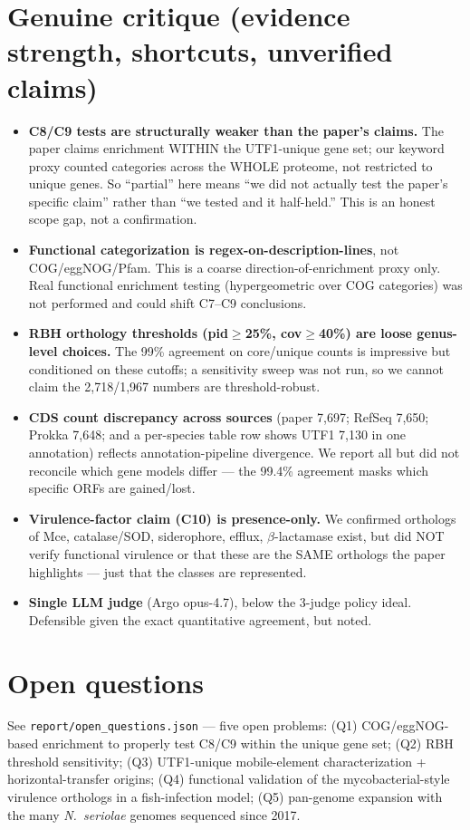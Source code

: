\documentclass[11pt]{article}
\begin{document}
\section{Genuine critique (evidence strength, shortcuts, unverified claims)}
\begin{itemize}[leftmargin=1.4em]
\item \textbf{C8/C9 tests are structurally weaker than the paper's claims.} The paper claims
enrichment WITHIN the UTF1-unique gene set; our keyword proxy counted categories across the
WHOLE proteome, not restricted to unique genes. So ``partial'' here means ``we did not
actually test the paper's specific claim'' rather than ``we tested and it half-held.'' This is
an honest scope gap, not a confirmation.
\item \textbf{Functional categorization is regex-on-description-lines}, not COG/eggNOG/Pfam.
This is a coarse direction-of-enrichment proxy only. Real functional enrichment testing
(hypergeometric over COG categories) was not performed and could shift C7--C9 conclusions.
\item \textbf{RBH orthology thresholds (pid$\geq$25\%, cov$\geq$40\%) are loose genus-level
choices.} The 99\% agreement on core/unique counts is impressive but conditioned on these
cutoffs; a sensitivity sweep was not run, so we cannot claim the 2{,}718/1{,}967 numbers are
threshold-robust.
\item \textbf{CDS count discrepancy across sources} (paper 7{,}697; RefSeq 7{,}650; Prokka
7{,}648; and a per-species table row shows UTF1 7{,}130 in one annotation) reflects
annotation-pipeline divergence. We report all but did not reconcile which gene models differ
--- the 99.4\% agreement masks which specific ORFs are gained/lost.
\item \textbf{Virulence-factor claim (C10) is presence-only.} We confirmed orthologs of Mce,
catalase/SOD, siderophore, efflux, $\beta$-lactamase exist, but did NOT verify functional
virulence or that these are the SAME orthologs the paper highlights --- just that the classes
are represented.
\item \textbf{Single LLM judge} (Argo opus-4.7), below the 3-judge policy ideal. Defensible
given the exact quantitative agreement, but noted.
\end{itemize}

\section{Open questions}
See \texttt{report/open\_questions.json} --- five open problems: (Q1) COG/eggNOG-based
enrichment to properly test C8/C9 within the unique gene set; (Q2) RBH threshold sensitivity;
(Q3) UTF1-unique mobile-element characterization + horizontal-transfer origins; (Q4)
functional validation of the mycobacterial-style virulence orthologs in a fish-infection
model; (Q5) pan-genome expansion with the many \textit{N.\ seriolae} genomes sequenced since 2017.
\end{document}
